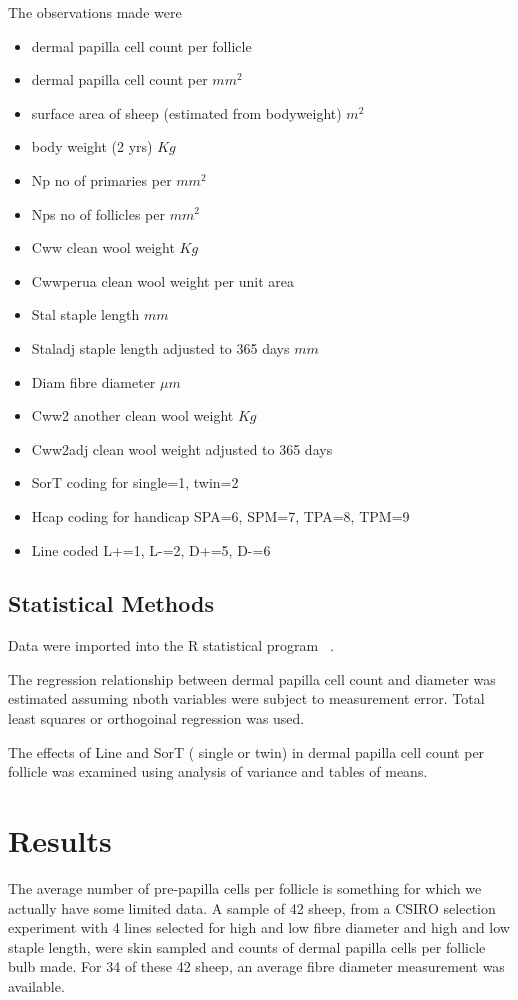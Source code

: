 \documentclass[titlepage]{article}  %
\begin{document}
The observations made were
\begin{itemize}
\item dermal papilla cell count per follicle
\item dermal papilla cell count per $mm^{2}$
\item surface area of sheep (estimated from bodyweight) $m^{2}$
\item body weight (2 yrs) $Kg$
\item Np no of primaries per $mm^{2}$
\item Nps no of follicles per $mm^{2}$
\item Cww clean wool weight $Kg$
\item Cwwperua clean wool weight per unit area
\item Stal staple length $mm$
\item Staladj staple length adjusted to 365 days $mm$
\item Diam fibre diameter $\mu m$
\item Cww2 another clean wool weight $Kg$
\item Cww2adj clean wool weight adjusted to 365 days
\item SorT coding for single=1, twin=2
\item Hcap coding for handicap SPA=6, SPM=7, TPA=8, TPM=9
\item Line coded L+=1, L-=2, D+=5, D-=6 
\end{itemize}



\subsection{Statistical Methods}
Data were imported into the R statistical program~\cite{rprog:13} .

The regression relationship between dermal papilla cell count and diameter was estimated assuming nboth variables were subject to measurement error. Total least squares or orthogoinal regression was used. 

The effects of Line and SorT ( single or twin) in dermal papilla cell count per follicle was examined using analysis of variance and tables of means.

\section{Results}

 The average number of pre-papilla cells per follicle  is something for which we actually have some limited data. A sample of 42 sheep, from a CSIRO selection experiment with  4 lines selected for high and low fibre diameter and high and low staple length, were skin sampled and counts of dermal papilla cells per follicle bulb made. For 34 of these 42 sheep, an average fibre diameter measurement was available.
\end{document}
